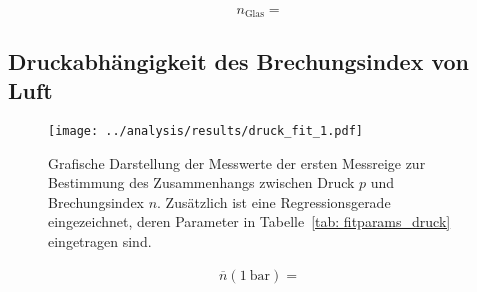 \begin{equation}
    n_{\text{Glas}} = 
\end{equation}




\subsection{Druckabhängigkeit des Brechungsindex von Luft}


\begin{figure}
    \centering
    \texttt{[image: ../analysis/results/druck\_fit\_1.pdf]}
    \label{fig: fit_druck}
    \caption{Grafische Darstellung der Messwerte der ersten Messreige zur Bestimmung des Zusammenhangs zwischen 
    Druck $p$ und Brechungsindex $n$. Zusätzlich ist eine Regressionsgerade eingezeichnet, deren Parameter in 
    Tabelle~\ref{tab: fitparams_druck} eingetragen sind.}
\end{figure}




\begin{align}
    \overline{n}\left(\SI{1}{\bar} \right) = 
\end{align}


